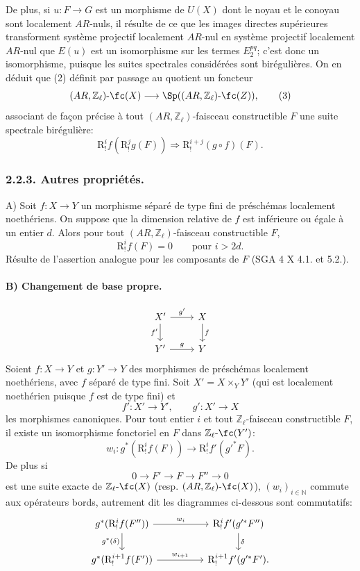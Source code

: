 De plus, si \(u:F\to G\) est un morphisme de \(U(X)\) dont le noyau et le conoyau sont localement \(AR\)-nuls, il résulte de ce que les images directes supérieures transforment système projectif localement \(AR\)-nul en système projectif localement \(AR\)-nul que \(E(u)\) est un isomorphisme sur les termes \(E_2^{pq}\); c'est donc un isomorphisme, puisque les suites spectrales considérées sont birégulières. On en déduit que (2) définit par passage au quotient un foncteur
\[
(AR,\mathbb{Z}_\ell)\text{-}\fc(X)
\longrightarrow \Sp((AR,\mathbb{Z}_\ell)\text{-}\fc(Z)),
\tag{3}
\]
associant de façon précise à tout \((AR,\mathbb{Z}_\ell)\)-faisceau constructible \(F\) une suite spectrale birégulière:
\[
\mathrm{R}^i_!f(\mathrm{R}^j_!g(F))\Longrightarrow \mathrm{R}^{i+j}_!(g\circ f)(F).
\]

\subsubsection*{2.2.3. Autres propriétés.}

A) Soit \(f:X\to Y\) un morphisme séparé de type fini de préschémas localement noethériens. On suppose que la dimension relative de \(f\) est inférieure ou égale à un entier \(d\). Alors pour tout \((AR,\mathbb{Z}_\ell)\)-faisceau constructible \(F\),
\[
\mathrm{R}^i_!f(F)=0\qquad\text{pour }i>2d.
\]
Résulte de l'assertion analogue pour les composants de \(F\) (SGA 4 X 4.1. et 5.2.).

\paragraph{B) Changement de base propre.}
\[
\begin{tikzcd}
X' \arrow[r,"g'"] \arrow[d,"f'"'] & X \arrow[d,"f"]\\
Y' \arrow[r,"g"] & Y
\end{tikzcd}
\]
Soient \(f:X\to Y\) et \(g:Y'\to Y\) des morphismes de préschémas localement noethériens, avec \(f\) séparé de type fini. Soit \(X'=X\times_Y Y'\) (qui est localement noethérien puisque \(f\) est de type fini) et
\[
f':X'\to Y',\qquad g':X'\to X
\]
les morphismes canoniques. Pour tout entier \(i\) et tout \(\mathbb{Z}_\ell\)-faisceau constructible \(F\), il existe un isomorphisme fonctoriel en \(F\) dans \(\mathbb{Z}_\ell\text{-}\fc(Y')\):
\[
w_i:g^*(\mathrm{R}^i_!f(F))\longrightarrow \mathrm{R}^i_!f'(g'^*F).
\]
De
plus si
\[
0\longrightarrow F'\longrightarrow F\longrightarrow F''\longrightarrow 0
\]
est une suite exacte de \(\mathbb{Z}_\ell\text{-}\fc(X)\) (resp. \((AR,\mathbb{Z}_\ell)\text{-}\fc(X)\)), \((w_i)_{i\in\mathbb{N}}\) commute aux opérateurs bords, autrement dit les diagrammes ci-dessous sont commutatifs:
\[
\begin{tikzcd}[column sep=huge]
g^*(\mathrm{R}^i_!f(F'')) \arrow[r,"w_i"] \arrow[d,"g^*(\delta)"']
&
\mathrm{R}^i_!f'(g'^*F'') \arrow[d,"\delta"]\\
g^*(\mathrm{R}^{i+1}_!f(F')) \arrow[r,"w_{i+1}"]
&
\mathrm{R}^{i+1}_!f'(g'^*F').
\end{tikzcd}
\]

